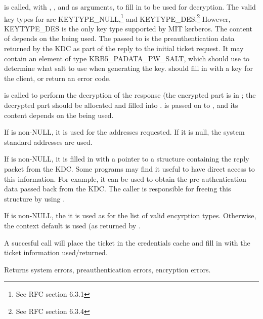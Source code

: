  is called, with , ,
 and as arguments, to fill in  to be used for
decryption.  The valid key types for  are
KEYTYPE_NULL,\footnote{See RFC section 6.3.1} and
KEYTYPE_DES.\footnote{See RFC section 6.3.4}  However, KEYTYPE_DES is
the only key type supported by MIT kerberos.
The content of   
depends on the  being used. %
The  passed
to  is the preauthentication data returned by the
KDC as part of the reply to the initial ticket request.  It may
contain an element of type KRB5_PADATA_PW_SALT, which
 should use to determine what salt to use when
generating the key.   should fill in
 with a key for the client, or return an error code.

 is called to perform the decryption of the
response (the encrypted part is in
; the decrypted part should be
allocated and filled into
.
 is passed on to , and
its content depends on the  being used.

If  is non-NULL, it is used for the addresses
requested.  If it is null, the system standard addresses are used.

If  is non-NULL, it is filled in with a
pointer to a structure containing the reply packet from the KDC.  Some
programs may find it useful to have direct access to this information.
For example, it can be used to obtain the pre-authentication data
passed back from the KDC.  The caller is responsible for freeing this
structure by using .

If  is non-NULL, the it is used as for the list of
valid encyrption types. Otherwise, the context default is used (as
returned by .

A succesful call will place the ticket in the credentials cache
 and fill in  with the ticket
information used/returned.

Returns system errors, preauthentication errors, encryption errors.


